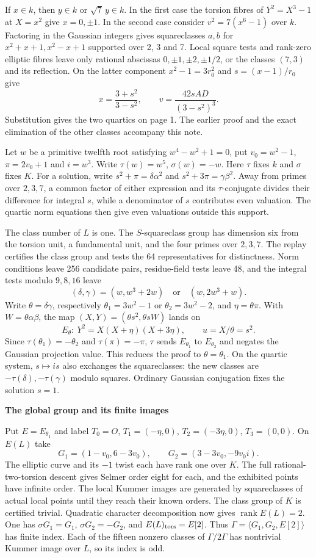 \documentclass[12pt]{article}
\newcommand{\head}[1]{{\Large\bfseries\color{ink}#1}\par\smallskip}
\begin{document}
If $x\in k$, then $y\in k$ or $\sqrt7\,y\in k$. In the first case the torsion fibres of $Y^2=X^3-1$ at $X=x^2$ give $x=0,\pm1$. In the second case consider $v^2=7(x^6-1)$ over $k$. Factoring in the Gaussian integers gives squareclasses $a,b$ for $x^2+x+1,x^2-x+1$ supported over 2, 3 and 7. Local square tests and rank-zero elliptic fibres leave only rational abscissas $0,\pm1,\pm2,\pm1/2$, or the classes $(7,3)$ and its reflection. On the latter component $x^2-1=3r_0^2$ and $s=(x-1)/r_0$ give
\[
 x=\frac{3+s^2}{3-s^2},\qquad v=\frac{42sAD}{(3-s^2)^3}.
\]
Substitution gives the two quartics on page 1. The earlier proof and the exact elimination of the other classes accompany this note.

Let $w$ be a primitive twelfth root satisfying $w^4-w^2+1=0$, put $v_0=w^2-1$, $\pi=2v_0+1$ and $i=w^3$. Write $\tau(w)=w^5$, $\sigma(w)=-w$. Here $\tau$ fixes $k$ and $\sigma$ fixes $K$. For a solution, write $s^2+\pi=\delta\alpha^2$ and $s^2+3\pi=\gamma\beta^2$. Away from primes over $2,3,7$, a common factor of either expression and its $\tau$-conjugate divides their difference for integral $s$, while a denominator of $s$ contributes even valuation. The quartic norm equations then give even valuations outside this support.

The class number of $L$ is one. The $S$-squareclass group has dimension six from the torsion unit, a fundamental unit, and the four primes over $2,3,7$. The replay certifies the class group and tests the 64 representatives for distinctness. Norm conditions leave 256 candidate pairs, residue-field tests leave 48, and the integral tests modulo $9,8,16$ leave
\[
       (\delta,\gamma)=(w,w^3+2w)\quad\text{or}\quad(w,2w^3+w).
\]
Write $\theta=\delta\gamma$, respectively $\theta_1=3w^2-1$ or $\theta_2=3w^2-2$, and $\eta=\theta\pi$. With $W=\theta\alpha\beta$, the map $(X,Y)=(\theta s^2,\theta sW)$ lands on
\[
        E_\theta:\ Y^2=X(X+\eta)(X+3\eta),\qquad u=X/\theta=s^2.
\]
Since $\tau(\theta_1)=-\theta_2$ and $\tau(\pi)=-\pi$, $\tau$ sends $E_{\theta_1}$ to $E_{\theta_2}$ and negates the Gaussian projection value. This reduces the proof to $\theta=\theta_1$. On the quartic system, $s\mapsto is$ also exchanges the squareclasses: the new classes are $-\tau(\delta),-\tau(\gamma)$ modulo squares. Ordinary Gaussian conjugation fixes the solution $s=1$.

\newpage
\head{The global group and its finite images}
Put $E=E_{\theta_1}$ and label $T_0=O$, $T_1=(-\eta,0)$, $T_2=(-3\eta,0)$, $T_3=(0,0)$. On $E(L)$ take
\[
 G_1=(1-v_0,6-3v_0),\qquad
 G_2=(3-3v_0,-9v_0 i).
\]
The elliptic curve and its $-1$ twist each have rank one over $K$. The full rational-two-torsion descent gives Selmer order eight for each, and the exhibited points have infinite order. The local Kummer images are generated by squareclasses of actual local points until they reach their known orders. The class group of $K$ is certified trivial. Quadratic character decomposition now gives $\operatorname{rank}E(L)=2$. One has $\sigma G_1=G_1$, $\sigma G_2=-G_2$, and $E(L)_{\rm tors}=E[2]$. Thus $\Gamma=\langle G_1,G_2,E[2]\rangle$ has finite index. Each of the fifteen nonzero classes of $\Gamma/2\Gamma$ has nontrivial Kummer image over $L$, so its index is odd.
\end{document}
